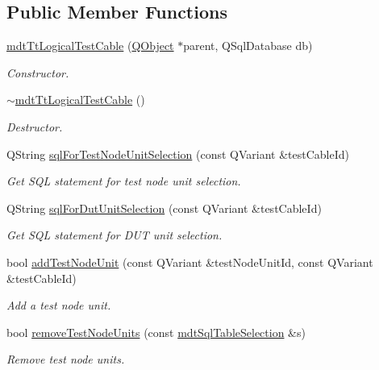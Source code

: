 \subsection*{Public Member Functions}
\begin{DoxyCompactItemize}
\item 
\hyperlink{classmdt_tt_logical_test_cable_a65273c35294da55d60c6058d8152dd99}{mdt\-Tt\-Logical\-Test\-Cable} (\hyperlink{class_q_object}{Q\-Object} $\ast$parent, Q\-Sql\-Database db)
\begin{DoxyCompactList}\small\item\em Constructor. \end{DoxyCompactList}\item 
\hyperlink{classmdt_tt_logical_test_cable_ab616c2d7e2d637c333bb4fdca0c04433}{$\sim$mdt\-Tt\-Logical\-Test\-Cable} ()
\begin{DoxyCompactList}\small\item\em Destructor. \end{DoxyCompactList}\item 
Q\-String \hyperlink{classmdt_tt_logical_test_cable_af28d1e414a57f7a5629cbadfd580f4ed}{sql\-For\-Test\-Node\-Unit\-Selection} (const Q\-Variant \&test\-Cable\-Id)
\begin{DoxyCompactList}\small\item\em Get S\-Q\-L statement for test node unit selection. \end{DoxyCompactList}\item 
Q\-String \hyperlink{classmdt_tt_logical_test_cable_a7673a73bc58e43362658398d89cfa6d0}{sql\-For\-Dut\-Unit\-Selection} (const Q\-Variant \&test\-Cable\-Id)
\begin{DoxyCompactList}\small\item\em Get S\-Q\-L statement for D\-U\-T unit selection. \end{DoxyCompactList}\item 
bool \hyperlink{classmdt_tt_logical_test_cable_ad0864808c772c8e5331745d389a7188b}{add\-Test\-Node\-Unit} (const Q\-Variant \&test\-Node\-Unit\-Id, const Q\-Variant \&test\-Cable\-Id)
\begin{DoxyCompactList}\small\item\em Add a test node unit. \end{DoxyCompactList}\item 
bool \hyperlink{classmdt_tt_logical_test_cable_aac46139aa117e61b265e63401125d181}{remove\-Test\-Node\-Units} (const \hyperlink{classmdt_sql_table_selection}{mdt\-Sql\-Table\-Selection} \&s)
\begin{DoxyCompactList}\small\item\em Remove test node units. \end{DoxyCompactList}\item 

\end{DoxyCompactItemize}
